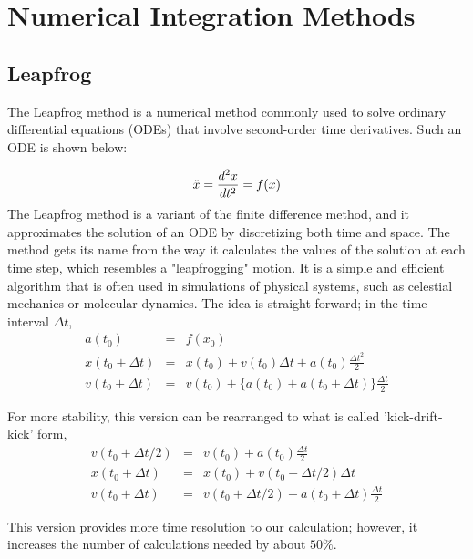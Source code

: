 \documentclass[a4paper,oneside,12pt]{report}
\numberwithin{equation}{chapter}
\begin{document}
\newpage



\section{Numerical Integration Methods}

\subsection{Leapfrog} \label{sec:leapfrog}
The Leapfrog method is a numerical method commonly used to solve ordinary differential equations (ODEs) that involve second-order time derivatives. Such an ODE is shown below:

\begin{equation}
    \ddot{x} = \frac{d^2 x}{dt^2} = f(x) \label{eq:second-order-ODE}
\end{equation}
\newline
The Leapfrog method is a variant of the finite difference method, and it approximates the solution of an ODE by discretizing both time and space. The method gets its name from the way it calculates the values of the solution at each time step, which resembles a "leapfrogging" motion. 
It is a simple and efficient algorithm that is often used in simulations of physical systems, such as celestial mechanics or molecular dynamics.
The idea is straight forward; in the time interval $\Delta t$, 
\begin{eqnarray}
    a(t_0) &=& f(x_0) \nonumber \\
    x(t_0 + \Delta t) &=& x(t_0) + v(t_0)\Delta t + a(t_0)\frac{\Delta t^2}{2} \label{eq:leapfrog_sync_x}\\
    v(t_0 + \Delta t) &=& v(t_0) + \{ a(t_0) + a(t_0 + \Delta t)\}\frac{\Delta t}{2}  \label{eq:leapfrog_sync_v}
\end{eqnarray}

For more stability, this version can be rearranged to what is called 'kick-drift-kick' form,
\begin{eqnarray} \label{eq:leapfrog}
    v(t_0 + \Delta t/2) &=& v(t_0) +  a(t_0)\frac{\Delta t}{2} \nonumber \\
    x(t_0 + \Delta t) &=& x(t_0) + v(t_0 + \Delta t/2)\Delta t \\
    v(t_0 + \Delta t) &=& v(t_0 + \Delta t/2) + a(t_0 + \Delta t)\frac{\Delta t}{2}  \nonumber
\end{eqnarray}

This version provides more time resolution to our calculation; however, it increases the number of calculations needed by about $50\%$.
\end{document}
